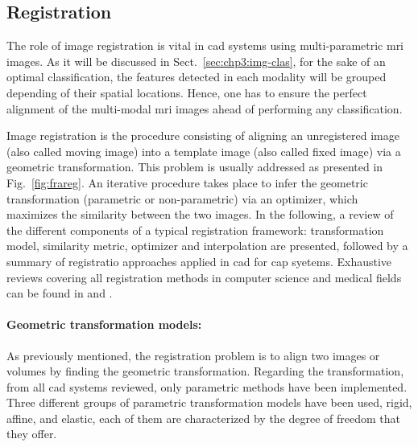 \subsection{Registration}\label{subsec:chp3img-reg:reg}


The role of image registration is vital in \ac{cad} systems using multi-parametric \ac{mri} images. 
As it will be discussed in Sect.~\ref{sec:chp3:img-clas}, for the sake of an optimal classification, the features detected in each modality will be grouped depending of their spatial locations. 
Hence, one has to ensure the perfect alignment of the multi-modal \ac{mri} images ahead of performing any classification.

Image registration is the procedure consisting of aligning an unregistered image (also called moving image) into a template image (also called fixed image) via a geometric transformation.
This problem is usually addressed as presented in Fig.~\ref{fig:frareg}.
An iterative procedure takes place to infer the geometric transformation (parametric or non-parametric) via an optimizer, which maximizes the similarity between the two images.
In the following, a review of the different components of a typical registration framework: transformation model, similarity metric, optimizer and interpolation are presented, followed by a summary of registratio approaches applied in \ac{cad} for \ac{cap} syetems.
Exhaustive reviews covering all registration methods in computer science and medical fields can be found in \cite{Maintz1998} and \cite{Zitova2003}.



\paragraph{Geometric transformation models:}
As previously mentioned, the registration problem is to align two images or volumes by finding the geometric transformation.
Regarding the transformation, from all \ac{cad} systems reviewed, only parametric methods have been implemented.
Three different groups of parametric transformation models have been used, rigid, affine, and elastic, each of them are characterized by the degree of freedom that they offer.

